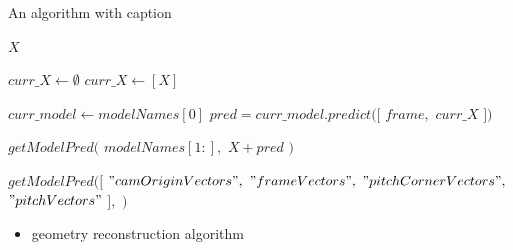 \documentclass[
11pt,
twoside
]{report}
\begin{document}
\begin{algorithm}
\begin{algorithmic}


\caption{An algorithm with caption}\label{alg:cap}


\State


        \State
        \Return $X$
    \EndIf

        \State $curr\_X \gets \emptyset$
    \Else
        \State $curr\_X \gets [X]$
    \EndIf

    \State $curr\_model \gets modelNames[0]$
    \State $pred = curr\_model.predict([$
            \State \indent $frame,$
            \State \indent $curr\_X$
    \State $])$


    \Return $getModelPred($
        \State \indent $modelNames[1:],$
        \State \indent $X + pred$
    \State $)$


\EndProcedure

\State
\State


    \State
    \Return $getModelPred([$
        \State \indent $"camOriginVectors",$
        \State \indent $"frameVectors",$
        \State \indent $"pitchCornerVectors",$
        \State \indent $"pitchVectors"$
        \State \indent $],$
        \State \indent \emptyset
        \State
    \State $)$

\EndProcedure


\end{algorithmic}
\end{algorithm}




\begin{itemize}
\item
  geometry reconstruction algorithm
\end{itemize}
\end{document}
